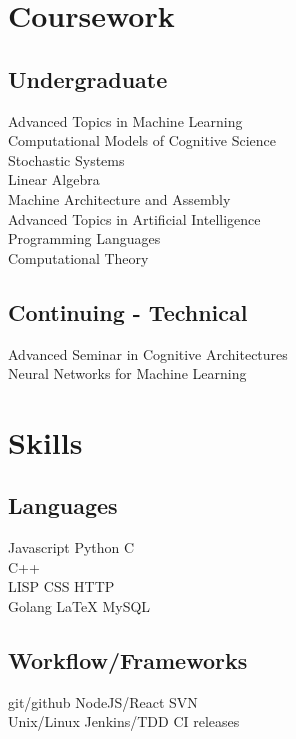 \documentclass[]{csaund-resume}
\begin{document}
\begin{minipage}[t]{0.33\textwidth}
\section{Coursework}
\subsection{Undergraduate}
Advanced Topics in Machine Learning \\
Computational Models of Cognitive Science \\
Stochastic Systems \\
Linear Algebra \\
Machine Architecture and Assembly \\
Advanced Topics in Artificial Intelligence \\
Programming Languages \\
Computational Theory \\
\sectionsep

\subsection{Continuing - Technical}
Advanced Seminar in Cognitive Architectures \\
Neural Networks for Machine Learning \\


\section{Skills}
\subsection{Languages}
Javascript \textbullet{} Python \textbullet{} C \\
C++ \textbullet{} \\
LISP \textbullet{} \textbullet{} CSS \textbullet{} HTTP \\
Golang \textbullet{} LaTeX \textbullet{} MySQL
\subsection{Workflow/Frameworks}
git/github \textbullet{} NodeJS/React \textbullet{} SVN \textbullet{} \\
 Unix/Linux \textbullet{} Jenkins/TDD \textbullet{} CI releases
\sectionsep

%
%

\end{minipage}
\end{document}
